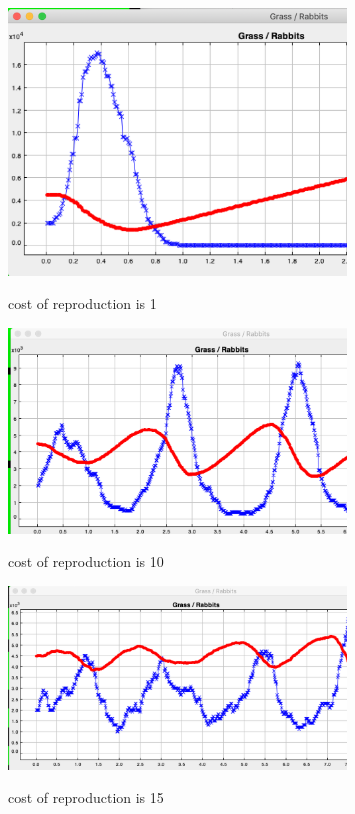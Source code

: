 \documentclass[11pt]{article}
\begin{document}
\begin{figure}[H]
\includegraphics[width=0.8\textwidth]{ex2-chart-1}
\centering
\label{fig:ex2-1}
\caption{ cost of reproduction is 1 }
\end{figure}

\begin{figure}[H]
\includegraphics[width=0.8\textwidth]{ex2-chart-10}
\centering
\label{fig:ex2-10}
\caption{ cost of reproduction is 10 }
\end{figure}

\begin{figure}[H]
\includegraphics[width=0.8\textwidth]{ex2-chart-15}
\centering
\label{fig:ex2-15}
\caption{ cost of reproduction is 15 }
\end{figure}
\end{document}
